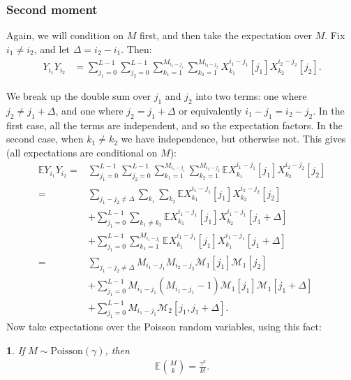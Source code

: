 \documentclass[12pt]{article}
\newcommand{\E}{\mathbb{E}}
\newcommand{\1}{\mathbf{1}}
\newcommand{\Poisson}{\text{Poisson}}
\newcommand{\M}{\mathcal{M}}
\theoremstyle{plain}
\theoremstyle{definition}
\theoremstyle{remark}
\theoremstyle{plain}
\newtheorem{lem}[thm]{\protect\lemmaname}
\theoremstyle{remark}
\theoremstyle{plain}
\theoremstyle{plain}
\theoremstyle{plain}
\providecommand{\lemmaname}{Lemma}
\numberwithin{equation}{section}
\begin{document}
\subsubsection{Second moment}

Again, we will condition on $M$ first, and then take the expectation over $M$. Fix $i_1 \ne i_2$, and let $\Delta = i_2 - i_1$. Then:
%
\begin{align}
%
Y_{i_1} Y_{i_2} 
&= \sum_{j_1=0}^{L-1} \sum_{j_2=0}^{L-1} 
\sum_{k_1=1}^{M_{i_1-j_1}}\sum_{k_2=1}^{M_{i_2-j_2}}
X_{k_1}^{i_1-j_1}[j_1] X_{k_2}^{i_2 - j_2}[j_2].
%
\end{align}

We break up the double sum over $j_1$ and $j_2$ into two terms: one where $j_2 \ne j_1 + \Delta$, and one where $j_2 = j_1 + \Delta$ or equivalently $i_1-j_1 = i_2-j_2$. In the first case, all the terms are independent, and so the expectation factors. In the second case, when $k_1 \ne k_2$ we have independence, but otherwise not. This gives (all expectations are conditional on $M$):
%
\begin{align} \label{moment2-condm}
%
\E Y_{i_1} Y_{i_2}
=& \sum_{j_1=0}^{L-1} \sum_{j_2=0}^{L-1} 
\sum_{k_1=1}^{M_{i_1-j_1}}\sum_{k_2=1}^{M_{i_2-j_2}}
\E X_{k_1}^{i_1-j_1}[j_1] X_{k_2}^{i_2 - j_2}[j_2]
\nonumber \\
=& \sum_{j_1 - j_2 \ne \Delta} \sum_{k_1} 
\sum_{k_2} \E X_{k_1}^{i_1-j_1}[j_1] X_{k_2}^{i_2 - j_2}[j_2]
\nonumber \\
& + \sum_{j_1 = 0}^{L-1} \sum_{k_1 \ne k_2} 
\E X_{k_1}^{i_1-j_1}[j_1] X_{k_2}^{i_1 - j_1}[j_1+\Delta]
\nonumber \\
& + \sum_{j_1 = 0}^{L-1} \sum_{k_1=1}^{M_{i_1-j_1}} 
\E X_{k_1}^{i_1-j_1}[j_1] X_{k_1}^{i_1-j_1}[j_1 + \Delta] 
\nonumber \\
=& \sum_{j_1 - j_2 \ne \Delta} M_{i_1-j_1} M_{i_2 - j_2} \M_1[j_1] \M_1[j_2]
\nonumber \\
& + \sum_{j_1 = 0}^{L-1} M_{i_1-j_1}(M_{i_1-j_1} - 1) \M_1[j_1] \M_1[j_1 + \Delta]
\nonumber \\
& + \sum_{j_1 = 0}^{L-1} M_{i_1-j_1} \M_2[j_1,j_1 + \Delta] .
%
\end{align}
%
Now take expectations over the Poisson random variables, using this fact:
%
\begin{lem} \label{lem-choose}
	If $M \sim \Poisson(\gamma)$, then 
	\begin{align}
	\E {M\choose k} = \frac{\gamma^k}{k!}.
	\end{align}
\end{lem}
\end{document}
